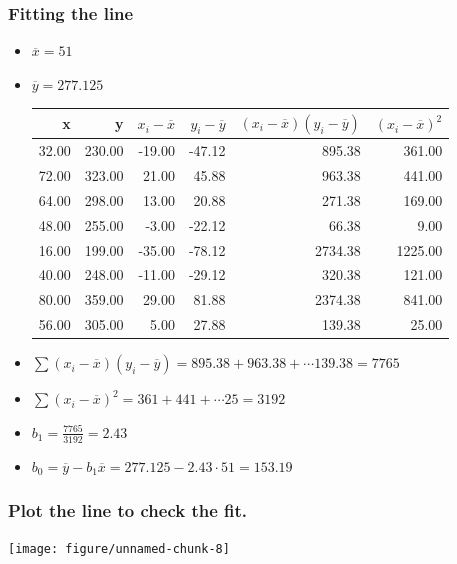 \documentclass[handout]{beamer}\usepackage{graphicx, color}
\newenvironment{knitrout}{}{} %
\providecommand{\ov}[1]{\overline{#1}}
\numberwithin{equation}{section}
\begin{document}
\begin{frame}[fragile]
\frametitle{Fitting the line} \scriptsize
\begin{itemize}
\pause \item $\ov{x} = 51$
\pause \item $\ov{y} = 277.125$ \pause
\begin{table}[ht]
\centering
\begin{tabular}{rrrrrr}
 x & y & $x_i - \ov{x}$ & $y_i - \ov{y}$ & $(x_i - \ov{x})(y_i - \ov{y})$ & $(x_i - \ov{x})^2$ \\ 
  \hline
32.00 & 230.00 & -19.00 & -47.12 & 895.38 & 361.00 \\ 
  72.00 & 323.00 & 21.00 & 45.88 & 963.38 & 441.00 \\ 
  64.00 & 298.00 & 13.00 & 20.88 & 271.38 & 169.00 \\ 
  48.00 & 255.00 & -3.00 & -22.12 & 66.38 & 9.00 \\ 
  16.00 & 199.00 & -35.00 & -78.12 & 2734.38 & 1225.00 \\ 
  40.00 & 248.00 & -11.00 & -29.12 & 320.38 & 121.00 \\ 
  80.00 & 359.00 & 29.00 & 81.88 & 2374.38 & 841.00 \\ 
  56.00 & 305.00 & 5.00 & 27.88 & 139.38 & 25.00 \\ 
  \end{tabular}
\end{table}


\pause \item $\sum (x_i - \ov{x})(y_i - \ov{y}) = 895.38 +  963.38  + \cdots  139.38  =  7765 $
\pause \item $\sum (x_i - \ov{x})^2= 361 +  441  + \cdots  25  =  3192 $
\pause \item $b_1 = \frac{7765}{3192} = 2.43$
\pause \item $b_0 = \ov{y} - b_1 \ov{x} = 277.125 - 2.43 \cdot 51 = 153.19$
\end{itemize}
\end{frame}


\begin{frame}[fragile]
\frametitle{Plot the line to check the fit.} \small
\begin{center}
\begin{knitrout}
\color{fgcolor}
\texttt{[image: figure/unnamed-chunk-8]} 

\end{knitrout}


\end{center}
\end{frame}
\end{document}
